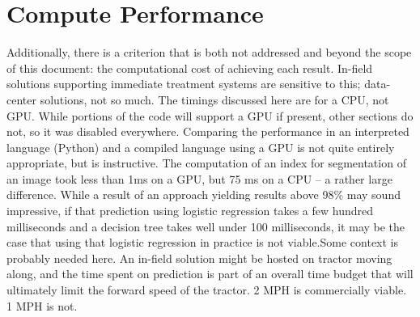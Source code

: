 \documentclass[letterpaper]{report}
\begin{document}
%
%



\section{Compute Performance}
\label{section:performance}
Additionally, there is a criterion that is both not addressed and beyond the scope of this document: the computational cost of achieving each result. In-field solutions supporting immediate treatment systems are sensitive to this; data-center solutions, not so much. The timings discussed here are for a CPU, not GPU. While portions of the code will support a GPU if present, other sections do not, so it was disabled everywhere. Comparing the performance in an interpreted language (Python) and a compiled language using a GPU is not quite entirely appropriate, but is instructive. The computation of an index for segmentation of an image took less than 1ms on a GPU, but 75 ms on a CPU -- a rather large difference. While a result of an approach yielding results above 98\% may sound impressive, if that prediction using logistic regression takes a few hundred milliseconds and a decision tree takes well under 100 milliseconds, it may be the case that using that logistic regression in practice is not viable.Some context is probably needed here. An in-field solution might be hosted on  tractor moving along, and the time spent on prediction is part of an overall time budget that will ultimately limit the forward speed of the tractor. 2 MPH is commercially viable. 1 MPH is not.
\end{document}
